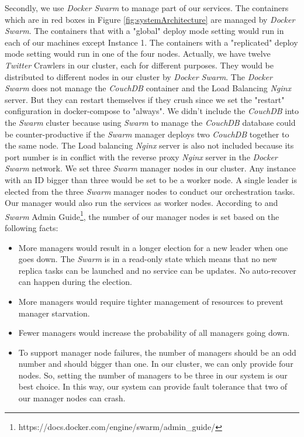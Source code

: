 \documentclass{article}
\begin{document}
Secondly, we use \textit{Docker Swarm} to manage part of our services. The containers which are in red boxes in Figure \ref{fig:systemArchitecture} are managed by \textit{Docker Swarm}. The containers that with a "global" deploy mode setting would run in each of our machines except Instance 1. The containers with a "replicated" deploy mode setting would run in one of the four nodes. Actually, we have twelve \textit{Twitter} Crawlers in our cluster, each for different purposes. They would be distributed to different nodes in our cluster by \textit{Docker Swarm}. The \textit{Docker Swarm} does not manage the \textit{CouchDB} container and the Load Balancing \textit{Nginx} server. But they can restart themselves if they crush since we set the "restart" configuration in docker-compose to "always". We didn't include the \textit{CouchDB} into the \textit{Swarm} cluster because using \textit{Swarm} to manage the \textit{CouchDB} database could be counter-productive if the \textit{Swarm} manager deploys two \textit{CouchDB} together to the same node. The Load balancing \textit{Nginx} server is also not included because its port number is in conflict with the reverse proxy \textit{Nginx} server in the \textit{Docker Swarm} network. We set three \textit{Swarm} manager nodes in our cluster. Any instance with an ID bigger than three would be set to be a worker node. A single leader is elected from the three \textit{Swarm} manager nodes to conduct our orchestration tasks. Our manager would also run the services as worker nodes. According to \cite{pros-and-cons-of-running-all-docker-swarm-nodes-as-managers} and \textit{Swarm} Admin Guide\footnote{https://docs.docker.com/engine/swarm/admin\_guide/}, the number of our manager nodes is set based on the following facts:

\begin{itemize}
	\item More managers would result in a longer election for a new leader when one goes down. The \textit{Swarm} is in a read-only state which means that no new replica tasks can be launched and no service can be updates. No auto-recover can happen during the election.
	\item More managers would require tighter management of resources to prevent manager starvation.
	\item Fewer managers would increase the probability of all managers going down.
	\item To support manager node failures, the number of managers should be an odd number and should bigger than one. In our cluster, we can only provide four nodes. So, setting the number of managers to be three in our system is our best choice. In this way, our system can provide fault tolerance that two of our manager nodes can crash.
\end{itemize}
\end{document}
